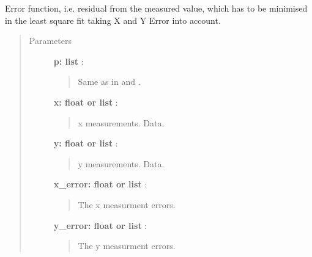 \documentclass[a4paper,10pt,english]{sphinxmanual}
\begin{document}

\begin{fulllineitems}
\label{functions:astrolyze.functions.astro_functions.linear_error_function}
Error function, i.e. residual from the measured value, which has to be
minimised in the least square fit taking X and Y Error into account.
\begin{quote}\begin{description}
\item[{Parameters }] \leavevmode
\textbf{p: list} :
\begin{quote}

Same as in {\hyperref[functions:astrolyze.functions.astro_functions.line]{}} and {\hyperref[functions:astrolyze.functions.astro_functions.anti_line]{}}.
\end{quote}

\textbf{x: float or list} :
\begin{quote}

x measurements. Data.
\end{quote}

\textbf{y: float or list} :
\begin{quote}

y measurements. Data.
\end{quote}

\textbf{x\_error: float or list} :
\begin{quote}

The x measurment errors.
\end{quote}

\textbf{y\_error: float or list} :
\begin{quote}

The y measurment errors.
\end{quote}

\end{description}\end{quote}

\end{fulllineitems}

\end{document}
